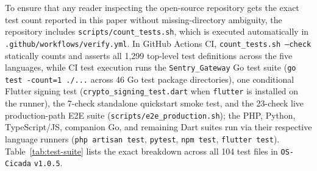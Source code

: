 \documentclass[11pt, a4paper]{article}
\begin{document}
To ensure that any reader inspecting the open-source repository gets the exact test count reported in this paper without missing-directory ambiguity, the repository includes \texttt{scripts/count\_tests.sh}, which is executed automatically in \texttt{.github/workflows/verify.yml}. In GitHub Actions CI, \texttt{count\_tests.sh --check} statically counts and asserts all 1,299 top-level test definitions across the five languages, while CI test execution runs the \texttt{Sentry\_Gateway} Go test suite (\texttt{go test -count=1 ./...} across 46 Go test package directories), one conditional Flutter signing test (\texttt{crypto\_signing\_test.dart} when \texttt{flutter} is installed on the runner), the 7-check standalone quickstart smoke test, and the 23-check live production-path E2E suite (\texttt{scripts/e2e\_production.sh}); the PHP, Python, TypeScript/JS, companion Go, and remaining Dart suites run via their respective language runners (\texttt{php artisan test}, \texttt{pytest}, \texttt{npm test}, \texttt{flutter test}). Table~\ref{tab:test-suite} lists the exact breakdown across all 104 test files in \texttt{OS-Cicada} \texttt{v1.0.5}.
\end{document}
